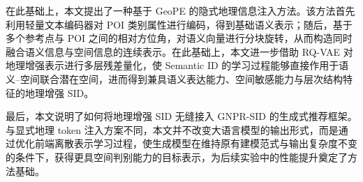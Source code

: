 在此基础上，本文提出了一种基于 GeoPE 的隐式地理信息注入方法。该方法首先利用轻量文本编码器对 POI 类别属性进行编码，得到基础语义表示；随后，基于多个参考点与 POI 之间的相对方位角，对语义向量进行分块旋转，从而构造同时融合语义信息与空间信息的连续表示。在此基础上，本文进一步借助 RQ-VAE 对地理增强表示进行多层残差量化，使 Semantic ID 的学习过程能够直接作用于语义--空间联合潜在空间，进而得到兼具语义表达能力、空间敏感能力与层次结构特征的地理增强 SID。

最后，本文说明了如何将地理增强 SID 无缝接入 GNPR-SID 的生成式推荐框架。与显式地理 token 注入方案不同，本文并不改变大语言模型的输出形式，而是通过优化前端离散表示学习过程，使生成模型在维持原有建模范式与输出复杂度不变的条件下，获得更具空间判别能力的目标表示，为后续实验中的性能提升奠定了方法基础。